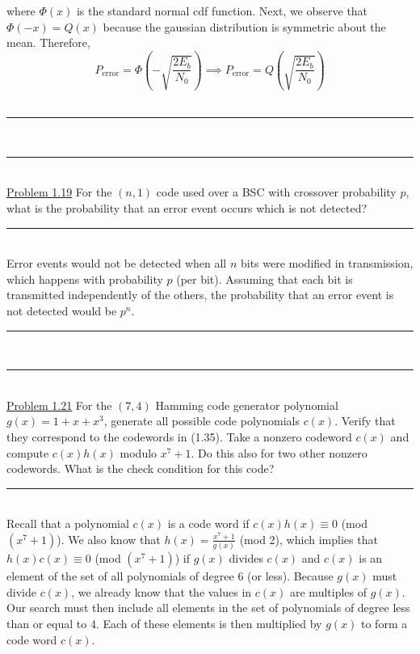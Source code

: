 \documentclass{article}
\newcommand{\problemsep}{\leavevmode\\[0.05in] \rule[\baselineskip/4]{\textwidth}{1pt} \\[0.005in] \rule[\baselineskip]{\textwidth}{1pt}\vspace{-\baselineskip}\leavevmode\\[0.05in]}
\newcommand{\statementsep}{\leavevmode\\[0.005in] \rule[\baselineskip/4]{\textwidth}{0.4pt}\leavevmode\\[0.005in]}
\begin{document}
where $\Phi(x)$ is the standard normal cdf function. Next, we observe that $\Phi(-x) = Q(x)$ because the gaussian distribution is symmetric about the mean. Therefore, 
\begin{equation*}
P_{\text{error}} = \Phi \left ( -\sqrt{\frac{2E_b}{N_0}} \right ) \implies P_{\text{error}} = Q\left ( \sqrt{\frac{2E_b}{N_0}}\right )	
\end{equation*}
\vspace{2in}
\problemsep
\noindent\underline{Problem 1.19}
For the $(n,1)$ code used over a BSC with crossover probability $p$, what is the probability that an error event occurs which is not detected?
\statementsep
Error events would not be detected when all $n$ bits were modified in transmission, which happens with probability $p$ (per bit). Assuming that each bit is transmitted independently of the others, the probability that an error event is not detected would be $p^n$.
\problemsep
\noindent\underline{Problem 1.21}
For the $(7,4)$ Hamming code generator polynomial $g(x) = 1 + x + x^3$, generate all possible code polynomials $c(x)$. Verify that they correspond to the codewords in (1.35). Take a nonzero codeword $c(x)$ and compute $c(x)h(x)$ modulo $x^7 + 1$. Do this also for two other nonzero codewords. What is the check condition for this code?
\statementsep
Recall that a polynomial $c(x)$ is a code word if $c(x)h(x) \equiv 0$ (mod $(x^7 + 1)$). We also know that $h(x) = \frac{x^7 + 1}{g(x)}$ (mod 2), which implies that $h(x)c(x) \equiv 0$ (mod $(x^7 + 1)$) if $g(x)$ divides $c(x)$ and $c(x)$ is an element of the set of all polynomials of degree 6 (or less). Because $g(x)$ must divide $c(x)$, we already know that the values in $c(x)$ are multiples of $g(x)$. Our search must then include all elements in the set of polynomials of degree less than or equal to 4. Each of these elements is then multiplied by $g(x)$ to form a code word $c(x)$. 
\end{document}
